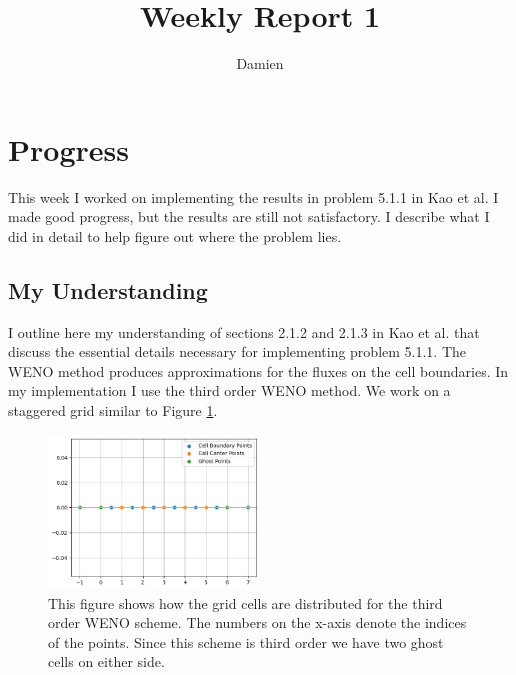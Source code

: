 \documentclass{article}
\title{Weekly Report 1}
\author{Damien}
\begin{document}
\maketitle
\section{Progress}
This week I worked on implementing the results in problem 5.1.1 in Kao et al. I made good progress, but the results are still not satisfactory. I describe what I did in detail to help figure out where the problem lies.
\subsection{My Understanding}
I outline here my understanding of sections 2.1.2 and 2.1.3 in Kao et al. that discuss the essential details necessary for implementing problem 5.1.1. The WENO method produces approximations for the fluxes on the cell boundaries. In my implementation I use the third order WENO method. We work on a staggered grid similar to Figure \ref*{fig:grid}.
\begin{figure}[h]
    \centering
    \includegraphics[width=0.5\textwidth]{imgs/grid.png}
    \caption{This figure shows how the grid cells are distributed for the third order WENO scheme. The numbers on the x-axis denote the indices of the points. Since this scheme is third order we have two ghost cells on either side.}
    \label{fig:grid}
\end{figure}
\end{document}
